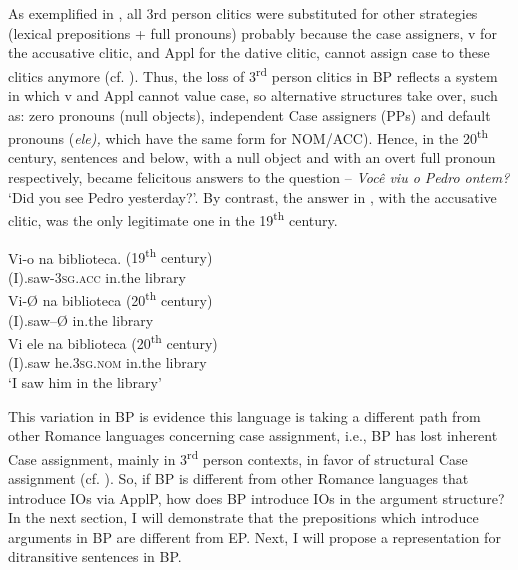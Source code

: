 \documentclass[output=paper,colorlinks,citecolor=brown]{./langscibook}
\begin{document}
As exemplified in , all 3rd person clitics were substituted for other strategies (lexical prepositions + full pronouns) probably because the case assigners, v for the accusative clitic, and Appl for the dative clitic, cannot assign case to these clitics anymore (cf. \citealt{CarvalhoCalindro2018}). Thus, the loss of 3\textsuperscript{rd} person clitics in BP reflects a system in which v and Appl cannot value case, so alternative structures take over, such as: zero pronouns (null objects), independent Case assigners (PPs) and default pronouns (\textit{ele),} which have the same form for NOM/ACC). Hence, in the 20\textsuperscript{th} century, sentences  and  below, with a null object and with an overt full pronoun respectively, became felicitous answers to the question – \textit{Você viu o Pedro ontem?} ‘Did you see Pedro yesterday?’. By contrast, the answer in , with the accusative clitic, was the only legitimate one in the 19\textsuperscript{th} century.

\ea%
    \label{ex:calindro:10}
    \ea\label{ex:calindro:10a}
    \gll Vi-{o}    na     biblioteca.  \hspace*{8em} {(19\textsuperscript{th} century)}\\
    (I).saw-\textsc{3sg.acc}     in.the     library\\
    \ex\label{ex:calindro:10b}
    \gll Vi-{Ø}    na   biblioteca   \hspace*{10.5em}   {(20\textsuperscript{th} century)}\\
    (I).saw–Ø  in.the  library\\
    \ex\label{ex:calindro:10c}
    \gll Vi        {ele}                     na        biblioteca  \hspace*{7em}  {(20\textsuperscript{th} century)}\\
    (I).saw    he.\textsc{3sg.nom}  in.the  library\\
    \glt ‘I saw him in the library’\hfill \citep[94]{CarvalhoCalindro2018}
    \z
\z

This variation in BP is evidence this language is taking a different path from other Romance languages concerning case assignment, i.e., BP has lost inherent Case assignment, mainly in 3\textsuperscript{rd} person contexts, in favor of structural Case assignment (cf. \citealt{Calindro2015, CarvalhoCalindro2018}). So, if BP is different from other Romance languages that introduce IOs via ApplP, how does BP introduce IOs in the argument structure? In the next section, I will demonstrate that the prepositions which introduce arguments in BP are different from EP. Next, I will propose a representation for ditransitive sentences in BP.
\end{document}
